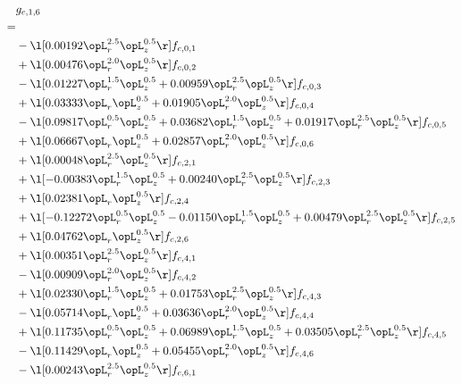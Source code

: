 \begin{alignat}{2} 
\label{eq:g_16_0} 
& g_{c,1,6} \nonumber \\ 
 = \\ 
& - \l[  0.00192 \opL_r^{2.5} \opL_z^{0.5}  \r] f_{c,0,1} \nonumber \\ 
& + \l[  0.00476 \opL_r^{2.0} \opL_z^{0.5}  \r] f_{c,0,2} \nonumber \\ 
& - \l[  0.01227 \opL_r^{1.5} \opL_z^{0.5} +  0.00959 \opL_r^{2.5} \opL_z^{0.5}  \r] f_{c,0,3} \nonumber \\ 
& + \l[  0.03333 \opL_r \opL_z^{0.5} +  0.01905 \opL_r^{2.0} \opL_z^{0.5}  \r] f_{c,0,4} \nonumber \\ 
& - \l[  0.09817 \opL_r^{0.5} \opL_z^{0.5} +  0.03682 \opL_r^{1.5} \opL_z^{0.5} +  0.01917 \opL_r^{2.5} \opL_z^{0.5}  \r] f_{c,0,5} \nonumber \\ 
& + \l[  0.06667 \opL_r \opL_z^{0.5} +  0.02857 \opL_r^{2.0} \opL_z^{0.5}  \r] f_{c,0,6} \nonumber \\ 
& + \l[  0.00048 \opL_r^{2.5} \opL_z^{0.5}  \r] f_{c,2,1} \nonumber \\ 
& + \l[  -0.00383 \opL_r^{1.5} \opL_z^{0.5} +  0.00240 \opL_r^{2.5} \opL_z^{0.5}  \r] f_{c,2,3} \nonumber \\ 
& + \l[  0.02381 \opL_r \opL_z^{0.5}  \r] f_{c,2,4} \nonumber \\ 
& + \l[  -0.12272 \opL_r^{0.5} \opL_z^{0.5}   -0.01150 \opL_r^{1.5} \opL_z^{0.5} +  0.00479 \opL_r^{2.5} \opL_z^{0.5}  \r] f_{c,2,5} \nonumber \\ 
& + \l[  0.04762 \opL_r \opL_z^{0.5}  \r] f_{c,2,6} \nonumber \\ 
& + \l[  0.00351 \opL_r^{2.5} \opL_z^{0.5}  \r] f_{c,4,1} \nonumber \\ 
& - \l[  0.00909 \opL_r^{2.0} \opL_z^{0.5}  \r] f_{c,4,2} \nonumber \\ 
& + \l[  0.02330 \opL_r^{1.5} \opL_z^{0.5} +  0.01753 \opL_r^{2.5} \opL_z^{0.5}  \r] f_{c,4,3} \nonumber \\ 
& - \l[  0.05714 \opL_r \opL_z^{0.5} +  0.03636 \opL_r^{2.0} \opL_z^{0.5}  \r] f_{c,4,4} \nonumber \\ 
& + \l[  0.11735 \opL_r^{0.5} \opL_z^{0.5} +  0.06989 \opL_r^{1.5} \opL_z^{0.5} +  0.03505 \opL_r^{2.5} \opL_z^{0.5}  \r] f_{c,4,5} \nonumber \\ 
& - \l[  0.11429 \opL_r \opL_z^{0.5} +  0.05455 \opL_r^{2.0} \opL_z^{0.5}  \r] f_{c,4,6} \nonumber \\ 
& - \l[  0.00243 \opL_r^{2.5} \opL_z^{0.5}  \r] f_{c,6,1} \nonumber \\ 

\end{alignat}
